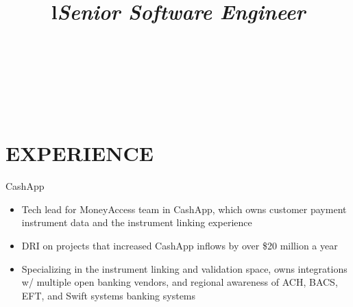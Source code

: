\documentclass[margin,11pt]{res}
\begin{document}

\address{mark.x.qi@gmail.com $\bullet$ 404-952-0273 $\bullet$ 921 NW 61$^{st}$ St., Seattle, WA 98107}


\begin{resume}

\begin{format}
\\
\title{l}\\
\body\\
\end{format}

\section{EXPERIENCE}

\title{\sl{Senior Software Engineer}}
\begin{position}
CashApp\\
\begin{itemize}
\item Tech lead for MoneyAccess team in CashApp, which owns customer payment instrument data and the instrument linking experience
\item DRI on projects that increased CashApp inflows by over \$20 million a year
\item Specializing in the instrument linking and validation space, owns integrations w/ multiple open banking vendors, and regional awareness of ACH, BACS, EFT, and Swift systems banking systems
\end{itemize}
\end{position}


\end{resume}
\end{document}
